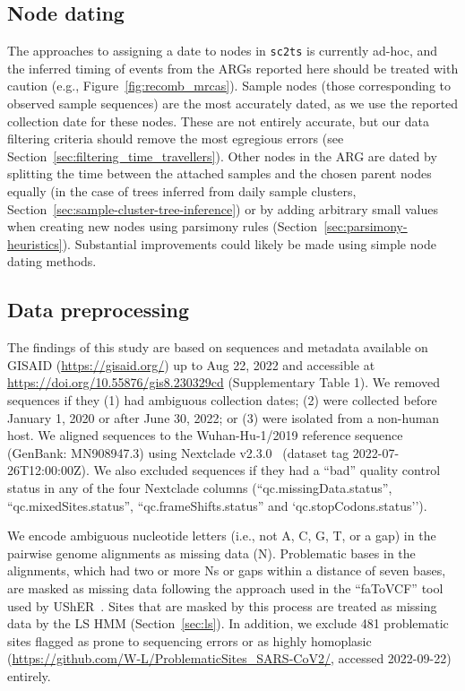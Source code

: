 \documentclass{article}
\begin{document}
\subsection{Node dating}
\label{sec:node_dating}
The approaches to assigning a date to nodes in \texttt{sc2ts} is currently
ad-hoc, and the inferred timing of events from the ARGs reported
here should be treated with caution (e.g., Figure~\ref{fig:recomb_mrcas}).
Sample nodes (those corresponding to observed sample sequences) are the
most accurately dated, as we use the reported collection date for
these nodes. These are not entirely accurate, but our data filtering
criteria should remove the most egregious errors (see
Section~\ref{sec:filtering_time_travellers}). Other nodes in the ARG
are dated by splitting the time between the attached samples
and the chosen parent nodes equally (in the case of
trees inferred from daily sample clusters,
Section~\ref{sec:sample-cluster-tree-inference}) or by adding arbitrary
small values when creating new nodes using parsimony rules
(Section~\ref{sec:parsimony-heuristics}). Substantial improvements could
likely be made using simple node dating methods.

\subsection{Data preprocessing}
\label{sec:data_preprocessing}
The findings of this study are
based on sequences and metadata available on GISAID (\url{https://gisaid.org/})
up to Aug 22, 2022 and accessible at
\url{https://doi.org/10.55876/gis8.230329cd} (Supplementary Table 1).
We removed sequences
if they (1) had ambiguous collection dates;
(2) were collected before January 1, 2020 or after June 30, 2022; or
(3) were isolated from a non-human host.
We aligned sequences to the Wuhan-Hu-1/2019 reference sequence
(GenBank: MN908947.3) using Nextclade v2.3.0~\citep{Aksamentov2021-hj} (dataset tag
2022-07-26T12:00:00Z). We also excluded sequences if they had a
``bad'' quality control status
in any of the four Nextclade columns (``qc.missingData.status'',
``qc.mixedSites.status'', ``qc.frameShifts.status'' and `qc.stopCodons.status'').

We encode ambiguous nucleotide letters (i.e.,
not A, C, G, T, or a gap) in the pairwise genome alignments as missing data
(N). Problematic bases in the alignments, which had two or more Ns or
gaps within a distance of seven bases, are masked as missing data following
the approach used in the ``faToVCF'' tool used by
UShER~\citep{Turakhia2022-it}.
Sites that are masked by this process are
treated as missing data by the LS HMM (Section~\ref{sec:ls}).
In addition, we exclude 481 problematic sites flagged as prone to
sequencing errors or as highly homoplasic
(\url{https://github.com/W-L/ProblematicSites_SARS-CoV2/},
accessed 2022-09-22) entirely.
\end{document}
